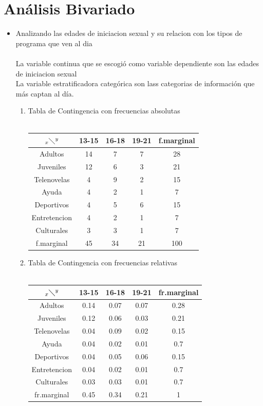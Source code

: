 \documentclass[letterpaper,spanish,11pt]{article}
\begin{document}
\section*{An\'alisis Bivariado}
\begin{itemize}
\item Analizando las edades de iniciacion sexual y su relacion con los tipos de programa que ven al dia\\\\
La variable continua que se escogi\'o como variable dependiente son las edades de iniciacion sexual\\
La variable estratificadora categ\'orica son lass categorias de informaci\'on que m\'as captan al d\'ia.
\begin{enumerate}
\item Tabla de Contingencia con frecuencias absolutas\\\\
        \begin{tabular}[c]{|c|c c c|c|}
        \hline
        $_x\diagdown ^{y}$ & 13-15 & 16-18 & 19-21 & f.marginal \\
        \hline
        Adultos & 14 & 7 & 7 & 28 \\
        Juveniles & 12 & 6 & 3 & 21 \\
        Telenovelas & 4 & 9 & 2 & 15 \\
        Ayuda & 4 & 2 & 1 & 7 \\
        Deportivos & 4 & 5 & 6 & 15 \\
        Entretencion & 4 & 2 & 1 & 7 \\
        Culturales & 3 & 3 & 1 & 7 \\
	\hline
        f.marginal & 45 & 34 & 21 & 100 \\
        \hline
        \end{tabular}

\item Tabla de Contingencia con frecuencias relativas\\\\

        \begin{tabular}[c]{|c|c c c|c|}
        \hline
        $_x\diagdown ^{y}$ & 13-15 & 16-18 & 19-21 & fr.marginal \\
        \hline
        Adultos & 0.14 & 0.07  & 0.07 & 0.28 \\
        Juveniles & 0.12 & 0.06 & 0.03 & 0.21 \\
        Telenovelas & 0.04 & 0.09 & 0.02 & 0.15 \\
        Ayuda & 0.04 & 0.02 & 0.01 & 0.7 \\
        Deportivos & 0.04 & 0.05 & 0.06 & 0.15 \\
        Entretencion & 0.04 & 0.02 & 0.01 & 0.7 \\
        Culturales & 0.03 & 0.03 & 0.01 & 0.7 \\
	\hline
        fr.marginal & 0.45 & 0.34 & 0.21 & 1 \\
        \hline
        \end{tabular}


\end{enumerate}
\end{itemize}
\end{document}
